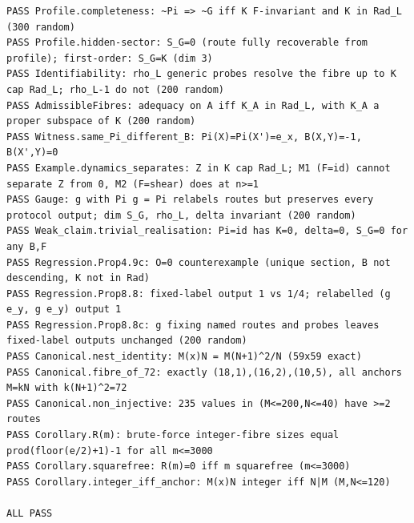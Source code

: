 \documentclass[11pt,a4paper]{article}
\theoremstyle{plain}
\theoremstyle{definition}
\begin{document}
\begin{lstlisting}[numbers=none,xleftmargin=0pt,basicstyle=\ttfamily\tiny,breaklines=true]
PASS Profile.completeness: ~Pi => ~G iff K F-invariant and K in Rad_L (300 random)
PASS Profile.hidden-sector: S_G=0 (route fully recoverable from profile); first-order: S_G=K (dim 3)
PASS Identifiability: rho_L generic probes resolve the fibre up to K cap Rad_L; rho_L-1 do not (200 random)
PASS AdmissibleFibres: adequacy on A iff K_A in Rad_L, with K_A a proper subspace of K (200 random)
PASS Witness.same_Pi_different_B: Pi(X)=Pi(X')=e_x, B(X,Y)=-1, B(X',Y)=0
PASS Example.dynamics_separates: Z in K cap Rad_L; M1 (F=id) cannot separate Z from 0, M2 (F=shear) does at n>=1
PASS Gauge: g with Pi g = Pi relabels routes but preserves every protocol output; dim S_G, rho_L, delta invariant (200 random)
PASS Weak_claim.trivial_realisation: Pi=id has K=0, delta=0, S_G=0 for any B,F
PASS Regression.Prop4.9c: O=0 counterexample (unique section, B not descending, K not in Rad)
PASS Regression.Prop8.8: fixed-label output 1 vs 1/4; relabelled (g e_y, g e_y) output 1
PASS Regression.Prop8.8c: g fixing named routes and probes leaves fixed-label outputs unchanged (200 random)
PASS Canonical.nest_identity: M(x)N = M(N+1)^2/N (59x59 exact)
PASS Canonical.fibre_of_72: exactly (18,1),(16,2),(10,5), all anchors M=kN with k(N+1)^2=72
PASS Canonical.non_injective: 235 values in (M<=200,N<=40) have >=2 routes
PASS Corollary.R(m): brute-force integer-fibre sizes equal prod(floor(e/2)+1)-1 for all m<=3000
PASS Corollary.squarefree: R(m)=0 iff m squarefree (m<=3000)
PASS Corollary.integer_iff_anchor: M(x)N integer iff N|M (M,N<=120)

ALL PASS
\end{lstlisting}
\end{document}
